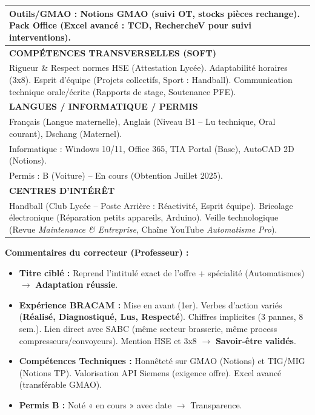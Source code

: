 \documentclass[11pt]{article}
\begin{document}
\begin{exoresolu}
\begin{center}
\begin{tabularx}{\linewidth}{|X|}
\textbf{Outils/GMAO :} Notions GMAO (suivi OT, stocks pièces rechange). Pack Office (Excel avancé : TCD, RechercheV pour suivi interventions). \\
\hline
\textbf{\textcolor{popblue}{COMPÉTENCES TRANSVERSELLES (SOFT)}} \\
Rigueur \& Respect normes HSE (Attestation Lycée). Adaptabilité horaires (3x8). Esprit d'équipe (Projets collectifs, Sport : Handball). Communication technique orale/écrite (Rapports de stage, Soutenance PFE). \\
\hline
\textbf{\textcolor{popblue}{LANGUES / INFORMATIQUE / PERMIS}} \\
Français (Langue maternelle), Anglais (Niveau B1 -- Lu technique, Oral courant), Dschang (Maternel). \\
Informatique : Windows 10/11, Office 365, TIA Portal (Base), AutoCAD 2D (Notions). \\
Permis : B (Voiture) -- En cours (Obtention Juillet 2025). \\
\hline
\textbf{\textcolor{popblue}{CENTRES D'INTÉRÊT}} \\
Handball (Club Lycée -- Poste Arrière : Réactivité, Esprit équipe). Bricolage électronique (Réparation petits appareils, Arduino). Veille technologique (Revue \emph{Maintenance \& Entreprise}, Chaîne YouTube \emph{Automatisme Pro}). \\
\hline
\end{tabularx}
\end{center}

\textbf{Commentaires du correcteur (Professeur) :}
\begin{itemize}
    \item \textbf{Titre ciblé :} Reprend l'intitulé exact de l'offre + spécialité (Automatismes) $\rightarrow$ \textbf{Adaptation réussie}.
    \item \textbf{Expérience BRACAM :} Mise en avant (1er). Verbes d'action variés (\textbf{Réalisé, Diagnostiqué, Lus, Respecté}). Chiffres implicites (3 pannes, 8 sem.). Lien direct avec SABC (même secteur brasserie, même process compresseurs/convoyeurs). Mention HSE et 3x8 $\rightarrow$ \textbf{Savoir-être validés}.
    \item \textbf{Compétences Techniques :} Honnêteté sur GMAO (Notions) et TIG/MIG (Notions TP). Valorisation API Siemens (exigence offre). Excel avancé (transférable GMAO).
    \item \textbf{Permis B :} Noté « en cours » avec date $\rightarrow$ Transparence.
\end{itemize}


\end{exoresolu}
\end{document}
